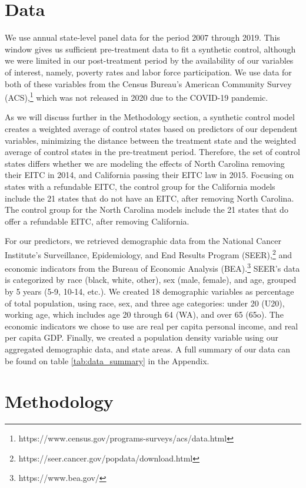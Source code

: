 \documentclass{article}
\begin{document}
\section{Data}

We use annual state-level panel data for the period 2007 through 2019. This window gives us sufficient pre-treatment data to fit a synthetic control, although we were limited in our post-treatment period by the availability of our variables of interest, namely, poverty rates and labor force participation. We use data for both of these variables from the Census Bureau's American Community Survey (ACS),\footnote{https://www.census.gov/programs-surveys/acs/data.html} which was not released in 2020 due to the COVID-19 pandemic. 

As we will discuss further in the Methodology section, a synthetic control model creates a weighted average of control states based on predictors of our dependent variables, minimizing the distance between the treatment state and the weighted average of control states in the pre-treatment period. Therefore, the set of control states differs whether we are modeling the effects of North Carolina removing their EITC in 2014, and California passing their EITC law in 2015. Focusing on states with a refundable EITC, the control group for the California models include the 21 states that do not have an EITC, after removing North Carolina. The control group for the North Carolina models include the 21 states that do offer a refundable EITC, after removing California.

For our predictors, we retrieved demographic data from the National Cancer Institute's Surveillance, Epidemiology, and End Results Program (SEER),\footnote{https://seer.cancer.gov/popdata/download.html} and economic indicators from the Bureau of Economic Analysis (BEA).\footnote{https://www.bea.gov/} SEER's data is categorized by race (black, white, other), sex (male, female), and age, grouped by 5 years (5-9, 10-14, etc.). We created 18 demographic variables as percentage of total population, using race, sex, and three age categories: under 20 (U20), working age, which includes age 20 through 64 (WA), and over 65 (65o). The economic indicators we chose to use are real per capita personal income, and real per capita GDP. Finally, we created a population density variable using our aggregated demographic data, and state areas. A full summary of our data can be found on table \ref{tab:data_summary} in the Appendix.

\section{Methodology}
\end{document}
